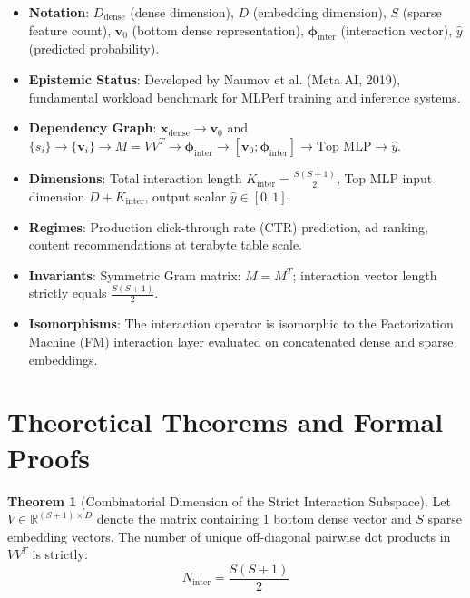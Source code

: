 \documentclass[11pt,a4paper]{article}
\theoremstyle{definition}
\newtheorem{theorem}{\textbf{Theorem}}[section]
\begin{document}
\begin{itemize}
    \item \textbf{Notation}: $D_{\text{dense}}$ (dense dimension), $D$ (embedding dimension), $S$ (sparse feature count), $\mathbf{v}_0$ (bottom dense representation), $\boldsymbol{\phi}_{\text{inter}}$ (interaction vector), $\widehat{y}$ (predicted probability).
    \item \textbf{Epistemic Status}: Developed by Naumov et al. (Meta AI, 2019), fundamental workload benchmark for MLPerf training and inference systems.
    \item \textbf{Dependency Graph}: $\mathbf{x}_{\text{dense}} \to \mathbf{v}_0$ and $\{s_i\} \to \{\mathbf{v}_i\} \to M = V V^T \to \boldsymbol{\phi}_{\text{inter}} \to [\mathbf{v}_0; \boldsymbol{\phi}_{\text{inter}}] \to \text{Top MLP} \to \widehat{y}$.
    \item \textbf{Dimensions}: Total interaction length $K_{\text{inter}} = \frac{S(S+1)}{2}$, Top MLP input dimension $D + K_{\text{inter}}$, output scalar $\widehat{y} \in [0, 1]$.
    \item \textbf{Regimes}: Production click-through rate (CTR) prediction, ad ranking, content recommendations at terabyte table scale.
    \item \textbf{Invariants}: Symmetric Gram matrix: $M = M^T$; interaction vector length strictly equals $\frac{S(S+1)}{2}$.
    \item \textbf{Isomorphisms}: The interaction operator is isomorphic to the Factorization Machine (FM) interaction layer evaluated on concatenated dense and sparse embeddings.
\end{itemize}

\section{Theoretical Theorems and Formal Proofs}

\begin{theorem}[Combinatorial Dimension of the Strict Interaction Subspace]
Let $V \in \mathbb{R}^{(S+1) \times D}$ denote the matrix containing 1 bottom dense vector and $S$ sparse embedding vectors. The number of unique off-diagonal pairwise dot products in $V V^T$ is strictly:
{\boldmath
\begin{equation}
N_{\text{inter}} = \frac{S(S + 1)}{2}
\end{equation}
}
\end{theorem}
\end{document}
